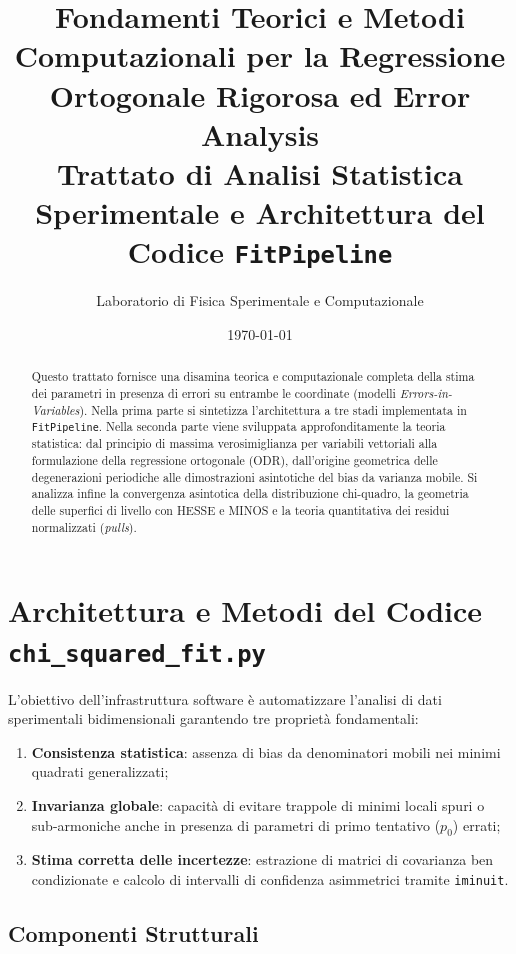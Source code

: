\documentclass[11pt,a4paper]{article}
\title{\textbf{Fondamenti Teorici e Metodi Computazionali per la Regressione Ortogonale Rigorosa ed Error Analysis}\\\large Trattato di Analisi Statistica Sperimentale e Architettura del Codice \texttt{FitPipeline}}
\author{Laboratorio di Fisica Sperimentale e Computazionale}
\date{\today}
\begin{document}
\maketitle

\begin{abstract}
Questo trattato fornisce una disamina teorica e computazionale completa della stima dei parametri in presenza di errori su entrambe le coordinate (modelli \emph{Errors-in-Variables}). Nella prima parte si sintetizza l'architettura a tre stadi implementata in \texttt{FitPipeline}. Nella seconda parte viene sviluppata approfonditamente la teoria statistica: dal principio di massima verosimiglianza per variabili vettoriali alla formulazione della regressione ortogonale (ODR), dall'origine geometrica delle degenerazioni periodiche alle dimostrazioni asintotiche del bias da varianza mobile. Si analizza infine la convergenza asintotica della distribuzione chi-quadro, la geometria delle superfici di livello con HESSE e MINOS e la teoria quantitativa dei residui normalizzati (\emph{pulls}).
\end{abstract}

\tableofcontents
\newpage

\section{Architettura e Metodi del Codice \texttt{chi\_squared\_fit.py}}

L'obiettivo dell'infrastruttura software è automatizzare l'analisi di dati sperimentali bidimensionali garantendo tre proprietà fondamentali:
\begin{enumerate}
    \item \textbf{Consistenza statistica}: assenza di bias da denominatori mobili nei minimi quadrati generalizzati;
    \item \textbf{Invarianza globale}: capacità di evitare trappole di minimi locali spuri o sub-armoniche anche in presenza di parametri di primo tentativo ($p_0$) errati;
    \item \textbf{Stima corretta delle incertezze}: estrazione di matrici di covarianza ben condizionate e calcolo di intervalli di confidenza asimmetrici tramite \texttt{iminuit}.
\end{enumerate}

\subsection{Componenti Strutturali}
\end{document}
